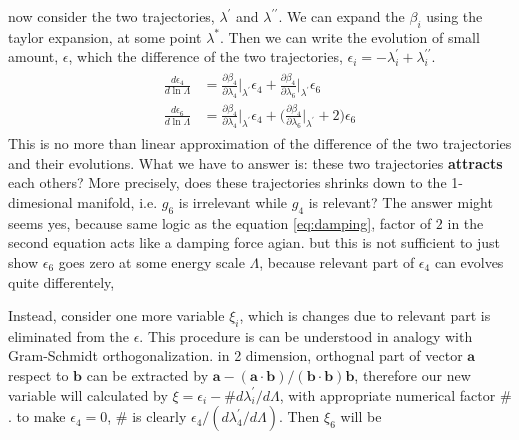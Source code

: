 \documentclass[12pt,halfline,a4paper]{ouparticle}
\begin{document}
now consider the two trajectories, $\lambda^\prime$ and $\lambda^{\prime\prime}$. We can expand the $\beta_i$ using the taylor expansion, at some point $\lambda^*$.
Then we can write the evolution of small amount, $\epsilon$, which the difference of the two trajectories, $\epsilon_i=-\lambda_i^\prime+\lambda_i^{\prime\prime}$.
\begin{align}\begin{split}
\frac{d \epsilon_4}{d\ln\Lambda}&=\frac{\partial\beta_4}{\partial\lambda_4}\bigg\lvert_{\lambda^\prime}\epsilon_4+\frac{\partial\beta_4}{\partial\lambda_6}\bigg\lvert_{\lambda^\prime}\epsilon_6\\
\frac{d \epsilon_6}{d\ln\Lambda}&=\frac{\partial\beta_4}{\partial\lambda_4}\bigg\lvert_{\lambda^\prime}\epsilon_4+\bigg(\frac{\partial\beta_4}{\partial\lambda_6}\bigg\lvert_{\lambda^\prime}+2\bigg)\epsilon_6
\end{split}\end{align}
This is no more than linear approximation of the difference of the two trajectories and their evolutions.
What we have to answer is: these two trajectories \textbf{attracts} each others? 
More precisely, does these trajectories shrinks down to the 1-dimesional manifold, i.e. $g_6$ is irrelevant while $g_4$ is relevant?
The answer might seems yes, because same logic as the equation \ref{eq:damping}, factor of $2$ in the second equation acts like a damping force agian.
but this is not sufficient to just show $\epsilon_6$ goes zero at some energy scale $\Lambda$, because relevant part of $\epsilon_4$ can evolves quite differentely, 

Instead, consider one more variable $\xi_i$, which is changes due to relevant part is eliminated from the $\epsilon$. This procedure is can be understood in analogy with Gram-Schmidt orthogonalization.
in 2 dimension, orthognal part of vector $\mathbf{a}$ respect to $\mathbf{b}$ can be extracted by $\mathbf{a}-(\mathbf{a}\cdot\mathbf{b})/(\mathbf{b}\cdot\mathbf{b})\mathbf{b}$, 
therefore our new variable will calculated by $\xi=\epsilon_i-\#d\lambda^\prime_i/d\Lambda$, with appropriate numerical factor $\#$.
to make $\epsilon_4=0$, $\#$ is clearly $\epsilon_4/(d\lambda^\prime_4/d\Lambda)$. Then $\xi_6$ will be
\end{document}
